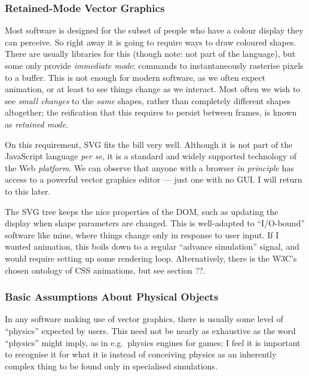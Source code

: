 \documentclass[english,submission]{programming}
\begin{document}
  \hypertarget{retained-mode-vector-graphics}{%
  \subsubsection{Retained-Mode Vector
  Graphics}\label{retained-mode-vector-graphics}}

  Most software is designed for the subset of people who have a colour
  display they can perceive. So right away it is going to require ways to
  draw coloured shapes. There are usually libraries for this (though note:
  not part of the language), but some only provide \emph{immediate mode}:
  commands to instantaneously rasterise pixels to a buffer. This is not
  enough for modern software, as we often expect animation, or at least to
  see things change as we interact. Most often we wish to see \emph{small
  changes} to the \emph{same} shapes, rather than completely different
  shapes altogether; the reification that this requires to persist between
  frames, is known as \emph{retained mode.}

  On this requirement, SVG fits the bill very well. Although it is not
  part of the JavaScript language \emph{per se}, it is a standard and
  widely supported technology of the Web \emph{platform}. We can observe
  that anyone with a browser \emph{in principle} has access to a powerful
  vector graphics editor --- just one with no GUI. I will return to this
  later.

  The SVG tree keeps the nice properties of the DOM, such as updating the
  display when shape parameters are changed. This is well-adapted to
  ``I/O-bound'' software like mine, where things change only in response
  to user input. If I wanted animation, this boils down to a regular
  ``advance simulation'' signal, and would require setting up some
  rendering loop. Alternatively, there is the W3C's chosen ontology of CSS
  animations, but see section ??.

  \hypertarget{basic-assumptions-about-physical-objects}{%
  \subsubsection{Basic Assumptions About Physical
  Objects}\label{basic-assumptions-about-physical-objects}}

  In any software making use of vector graphics, there is usually some
  level of ``physics'' expected by users. This need not be nearly as
  exhaustive as the word ``physics'' might imply, as in e.g.~physics
  engines for games; I feel it is important to recognise it for what it is
  instead of conceiving physics as an inherently complex thing to be found
  only in specialised simulations.
\end{document}
